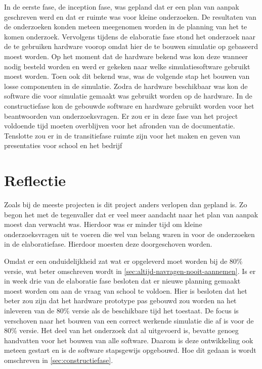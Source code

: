 \documentclass[a4paper, 11pt, oneside]{report}
\begin{document}
In de eerste fase, de inception fase, was gepland dat er een plan van aanpak geschreven werd en dat er ruimte was voor kleine onderzoeken. 
De resultaten van de onderzoeken konden meteen meegenomen worden in de planning van het te komen onderzoek.
Vervolgens tijdens de elaboratie fase stond het onderzoek naar de te gebruiken hardware voorop omdat hier de te bouwen simulatie op gebaseerd moest worden.    
Op het moment dat de hardware bekend was kon deze wanneer nodig besteld worden en werd er gekeken naar welke simulatiesoftware gebruikt moest worden.
Toen ook dit bekend was, was de volgende stap het bouwen van losse componenten in de simulatie. 
Zodra de hardware beschikbaar was kon de software die voor simulatie gemaakt was gebruikt worden op de hardware.
In de constructiefase kon de gebouwde software en hardware gebruikt worden voor het beantwoorden van onderzoeksvragen. 
Er zou er in deze fase van het project voldoende tijd moeten overblijven voor het afronden van de documentatie.
Tenslotte zou er in de transitiefase ruimte zijn voor het maken en geven van presentaties voor school en het bedrijf
 
\section{Reflectie}\label{sec:reflectie}

Zoals bij de meeste projecten is dit project anders verlopen dan gepland is. Zo begon het met de tegenvaller dat er veel meer aandacht naar het plan van aanpak moest dan verwacht was. Hierdoor was er minder tijd om kleine onderzoeksvragen uit te voeren die wel van belang waren in voor de onderzoeken in de elaboratiefase. Hierdoor moesten deze doorgeschoven worden.

Omdat er een onduidelijkheid zat wat er opgeleverd moet worden bij de 80\% versie, wat beter omschreven wordt in \autoref{sec:altijd-navragen-nooit-aannemen}. Is er in week drie van de elaboratie fase besloten dat er nieuwe planning gemaakt moest worden om aan de vraag van school te voldoen. 
Hier is besloten dat het beter zou zijn dat het hardware prototype pas gebouwd zou worden na het inleveren van de 80\% versie als de beschikbare tijd het toestaat. 
De focus is verschoven naar het bouwen van een correct werkende simulatie die af is voor  de 80\% versie.
Het deel van het onderzoek dat al uitgevoerd is, bevatte genoeg handvatten voor het bouwen van alle software. 
Daarom is deze ontwikkeling ook meteen gestart en is de software stapsgewijs opgebouwd. Hoe dit gedaan is wordt omschreven in \autoref{sec:constructiefase}. 
\end{document}
